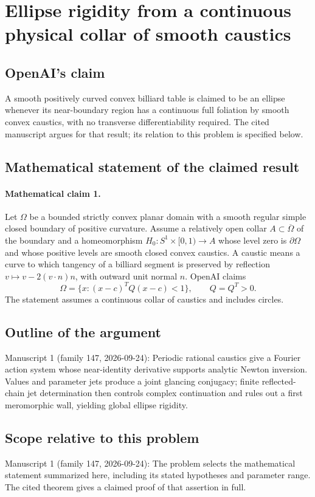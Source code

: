 \documentclass[11pt]{article}
\begin{document}
\section*{Ellipse rigidity from a continuous physical collar of smooth caustics}

\subsection{OpenAI's claim}
A smooth positively curved convex billiard table is claimed to be an ellipse whenever its near-boundary region has a continuous full foliation by smooth convex caustics, with no transverse differentiability required. The cited manuscript argues for that result; its relation to this problem is specified below.

\subsection{Mathematical statement of the claimed result}
\paragraph{Mathematical claim 1.} Let $\Omega$ be a bounded strictly convex planar domain with a smooth regular simple closed boundary of positive curvature. Assume a relatively open collar $A\subset\overline\Omega$ of the boundary and a homeomorphism $H_0:S^1\times[0,1)\to A$ whose level zero is $\partial\Omega$ and whose positive levels are smooth closed convex caustics. A caustic means a curve to which tangency of a billiard segment is preserved by reflection $v\mapsto v-2(v\cdot n)n$, with outward unit normal $n$. OpenAI claims
\[
\Omega=\{x:(x-c)^TQ(x-c)<1\},\qquad Q=Q^T>0.
\]
The statement assumes a continuous collar of caustics and includes circles.

\subsection{Outline of the argument}
Manuscript 1 (family 147, 2026-09-24): Periodic rational caustics give a Fourier action system whose near-identity derivative supports analytic Newton inversion. Values and parameter jets produce a joint glancing conjugacy; finite reflected-chain jet determination then controls complex continuation and rules out a first meromorphic wall, yielding global ellipse rigidity.

\subsection{Scope relative to this problem}
Manuscript 1 (family 147, 2026-09-24): The problem selects the mathematical statement summarized here, including its stated hypotheses and parameter range. The cited theorem gives a claimed proof of that assertion in full.
\end{document}
